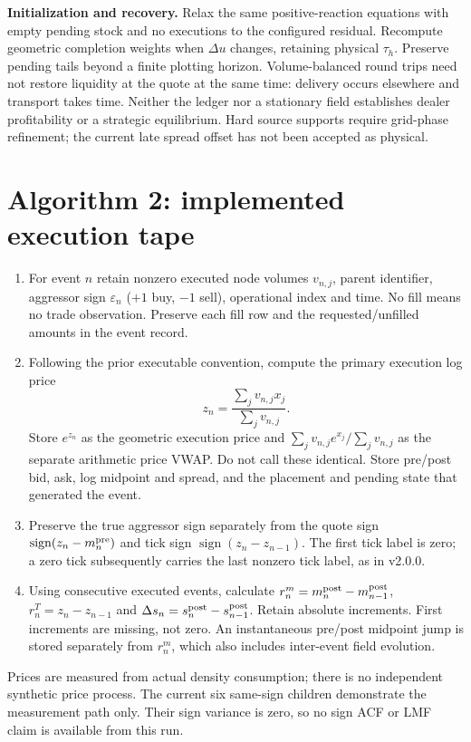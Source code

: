 \documentclass[11pt,a4paper]{article}
\newcommand{\du}{\Delta u}\newcommand{\dx}{\Delta x}
\begin{document}
\textbf{Initialization and recovery.} Relax the same positive-reaction equations
with empty pending stock and no executions to the configured residual.
Recompute geometric completion weights when $\du$ changes, retaining physical
$\tau_h$. Preserve pending tails beyond a finite plotting horizon.
Volume-balanced round trips need not restore liquidity at the quote at the
same time: delivery occurs elsewhere and transport takes time. Neither the
ledger nor a stationary field establishes dealer profitability or a strategic
equilibrium. Hard source supports require grid-phase refinement; the current
late spread offset has not been accepted as physical.

\newpage
\section{Algorithm 2: implemented execution tape}
\begin{enumerate}
\item For event $n$ retain nonzero executed node volumes $v_{n,j}$, parent
identifier, aggressor sign $\varepsilon_n$ ($+1$ buy, $-1$ sell), operational
index and time. No fill means no trade observation. Preserve each fill row
and the requested/unfilled amounts in the event record.
\item Following the prior executable convention, compute the primary
execution log price
\[
 z_n=\frac{\sum_jv_{n,j}x_j}{\sum_jv_{n,j}}.
\]
Store $e^{z_n}$ as the geometric execution price and
$\sum_jv_{n,j}e^{x_j}/\sum_jv_{n,j}$ as the separate arithmetic price VWAP.
Do not call these identical. Store pre/post bid, ask, log midpoint and spread,
and the placement and pending state that generated the event.
\item Preserve the true aggressor sign separately from the quote sign
$\operatorname{sign}(z_n-m_n^{\rm pre})$ and tick sign
$\operatorname{sign}(z_n-z_{n-1})$. The first tick label is zero;
a zero tick subsequently carries the last nonzero tick label, as in v2.0.0.
\item Using consecutive executed events, calculate
$r^m_n=m_n^{\rm post}-m_{n-1}^{\rm post}$,
$r^T_n=z_n-z_{n-1}$ and
$\Delta s_n=s_n^{\rm post}-s_{n-1}^{\rm post}$.
Retain absolute increments. First increments are missing, not zero.
An instantaneous pre/post midpoint jump is stored separately from $r^m_n$,
which also includes inter-event field evolution.
\end{enumerate}
Prices are measured from actual density consumption; there is no independent
synthetic price process. The current six same-sign children demonstrate the
measurement path only. Their sign variance is zero, so no sign ACF or LMF
claim is available from this run.
\end{document}
